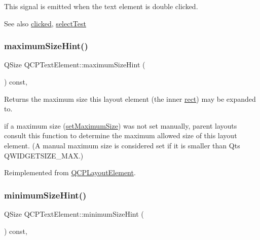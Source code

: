 This signal is emitted when the text element is double clicked.

\begin{DoxySeeAlso}{See also}
\hyperlink{class_q_c_p_text_element_ad2246a0e701c0655623f048737298334}{clicked}, \hyperlink{class_q_c_p_text_element_a1e721bc2994a127ef5a8f0a514a5dbac}{select\+Test} 
\end{DoxySeeAlso}
\mbox{\label{class_q_c_p_text_element_a65e5f4c5a852bbff48acef236048354f}} 
\subsubsection{\texorpdfstring{maximum\+Size\+Hint()}{maximumSizeHint()}}
{\footnotesize\ttfamily Q\+Size Q\+C\+P\+Text\+Element\+::maximum\+Size\+Hint (\begin{DoxyParamCaption}{ }\end{DoxyParamCaption}) const\hspace{0.3cm}{\ttfamily [protected]}, {\ttfamily [virtual]}}

Returns the maximum size this layout element (the inner \hyperlink{class_q_c_p_layout_element_a208effccfe2cca4a0eaf9393e60f2dd4}{rect}) may be expanded to.

if a maximum size (\hyperlink{class_q_c_p_layout_element_a74eb5280a737ab44833d506db65efd95}{set\+Maximum\+Size}) was not set manually, parent layouts consult this function to determine the maximum allowed size of this layout element. (A manual maximum size is considered set if it is smaller than Qt\textquotesingle{}s Q\+W\+I\+D\+G\+E\+T\+S\+I\+Z\+E\+\_\+\+M\+AX.) 

Reimplemented from \hyperlink{class_q_c_p_layout_element_ab5ce2ba22b36d9a3b70a1be562c326e5}{Q\+C\+P\+Layout\+Element}.

\mbox{\label{class_q_c_p_text_element_a5b6e94c79d0cd56c13cbedbb7021ea08}} 
\subsubsection{\texorpdfstring{minimum\+Size\+Hint()}{minimumSizeHint()}}
{\footnotesize\ttfamily Q\+Size Q\+C\+P\+Text\+Element\+::minimum\+Size\+Hint (\begin{DoxyParamCaption}{ }\end{DoxyParamCaption}) const\hspace{0.3cm}{\ttfamily [protected]}, {\ttfamily [virtual]}}

